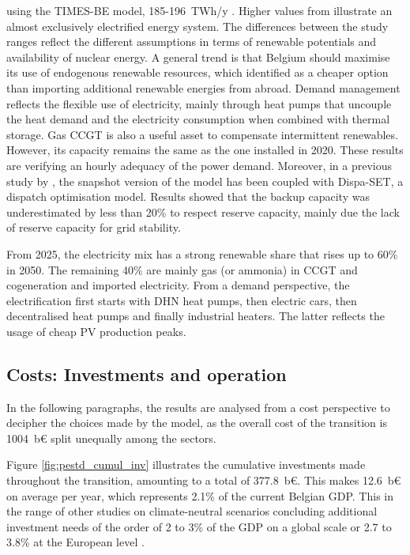 using the TIMES-BE model, 185-196~TWh/y \cite{PATHS2050}. Higher values from \citet{Devogelaer2013} illustrate an almost exclusively electrified energy system. The differences between the study ranges reflect the different assumptions in terms of renewable potentials and availability of nuclear energy. A general trend is that Belgium should maximise its use of endogenous renewable resources, which \citet{dubois2023multi} identified as a cheaper option than importing additional renewable energies from abroad. Demand management reflects the flexible use of electricity, mainly through heat pumps that uncouple the heat demand and the electricity consumption when combined with thermal storage. Gas \gls{CCGT} is also a useful asset to compensate intermittent renewables. However, its capacity remains the same as the one installed in 2020. These results are verifying an hourly adequacy of the power demand. Moreover, in a previous study by \citet{pavivcevic2022bidirectionnal}, the snapshot version of the model has been coupled with Dispa-SET, a dispatch optimisation model. Results showed that the backup capacity was underestimated by less than 20\% to respect reserve capacity, mainly due the lack of reserve capacity for grid stability.  

From 2025, the electricity mix has a strong renewable share that rises up to 60\% in 2050. The remaining 40\% are mainly gas (or ammonia) in \gls{CCGT} and cogeneration and imported electricity. From a demand perspective, the electrification first starts with \gls{DHN} heat pumps, then electric cars, then decentralised heat pumps and finally industrial heaters. The latter reflects the usage of cheap \gls{PV} production peaks. 

\subsection{Costs: Investments and operation}

In the following paragraphs, the results are analysed from a cost perspective to decipher the choices made by the model, as the overall cost of the transition is 1004~b€ split unequally among the sectors. 

Figure \ref{fig:pestd_cumul_inv} illustrates the cumulative investments made throughout the transition, amounting to a total of 377.8~b€. This makes 12.6~b€ on average per year, which represents 2.1\% of the current Belgian \gls{GDP}. This in the range of other studies on climate-neutral scenarios concluding additional investment needs of the order of 2 to 3\% of the \gls{GDP} on a global scale \cite{IEA2021,IRENA2021} or 2.7 to 3.8\% at the European level \cite{Widuto2023}.

